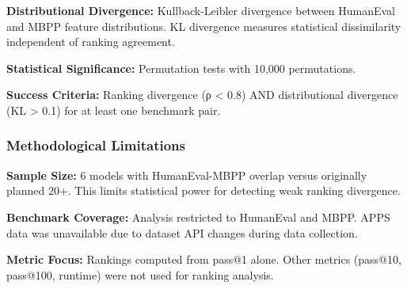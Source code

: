 \textbf{Distributional Divergence:} Kullback-Leibler divergence between HumanEval and MBPP feature distributions. KL divergence measures statistical dissimilarity independent of ranking agreement.

\textbf{Statistical Significance:} Permutation tests with 10,000 permutations.

\textbf{Success Criteria:} Ranking divergence (ρ < 0.8) AND distributional divergence (KL > 0.1) for at least one benchmark pair.

\subsubsection{Methodological Limitations}

\textbf{Sample Size:} 6 models with HumanEval-MBPP overlap versus originally planned 20+. This limits statistical power for detecting weak ranking divergence.

\textbf{Benchmark Coverage:} Analysis restricted to HumanEval and MBPP. APPS data was unavailable due to dataset API changes during data collection.

\textbf{Metric Focus:} Rankings computed from pass@1 alone. Other metrics (pass@10, pass@100, runtime) were not used for ranking analysis.
